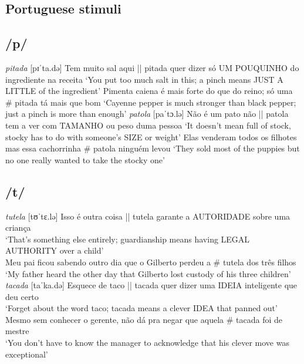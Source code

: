 \documentclass[output=paper]{langscibook}
\begin{document}
\begin{paperappendix}
\section{Portuguese stimuli}\label{C}\label{appendix:napo:c}

\subsection{/p/}
\ea \textit{pitada} [pɪˈta.də]
\ea Tem muito sal aqui || pitada quer dizer só UM POUQUINHO do ingrediente na receita
\glt`You put too much salt in this; a pinch means JUST A LITTLE of the ingredient'
\ex Pimenta caiena é mais forte do que do reino; só uma \# pitada tá mais que bom
\glt`Cayenne pepper is much stronger than black pepper; just a pinch is more than enough'
\z
\ex \textit{patola} [paˈtɔ.lə]
\ea Não é um pato não || patola tem a ver com TAMANHO ou peso duma pessoa
\glt`It doesn't mean full of stock, stocky has to do with someone's SIZE or weight'
\ex Elas venderam todos os filhotes mas essa cachorrinha \# patola ninguém levou
\glt`They sold most of the puppies but no one really wanted to take the stocky one'
\z
\z

\subsection{/t/}
\ea \textit{tutela} [tʊˈtɛ.lə]
\ea Isso é outra coisa || tutela garante a AUTORIDADE sobre uma criança\\
\glt`That's something else entirely; guardianship means having LEGAL AUTHORITY over a child'\\
\ex Meu pai ficou sabendo outro dia que o Gilberto perdeu a \# tutela dos três filhos\\
\glt`My father heard the other day that Gilberto lost custody of his three children'\\
\z
\ex \textit{tacada} [taˈka.də]
\ea Esquece de taco || tacada quer dizer uma IDEIA inteligente que deu certo\\
\glt`Forget about the word taco; tacada means a clever IDEA that panned out'\\
\ex Mesmo sem conhecer o gerente, não dá pra negar que aquela \# tacada foi de mestre\\
\glt`You don't have to know the manager to acknowledge that his clever move was exceptional'\\
\z
\z


\end{paperappendix}
\end{document}

